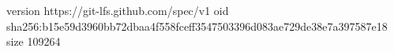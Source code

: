 version https://git-lfs.github.com/spec/v1
oid sha256:b15e59d3960bb72dbaa4f558fceff3547503396d083ae729de38e7a397587e18
size 109264
